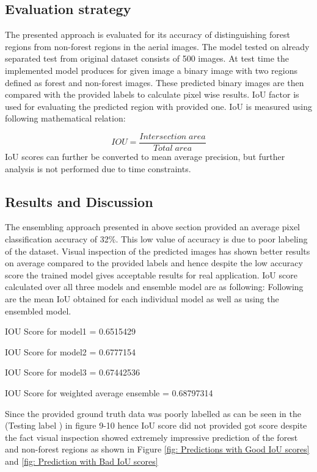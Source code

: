 \documentclass[rnd]{mas_proposal}
\begin{document}
\subsection{Evaluation strategy}



The presented approach is evaluated for its accuracy of distinguishing forest regions from non-forest regions in the aerial images. The model tested on already separated test from original dataset consists of 500 images. At test time the implemented model produces for given image a binary image with two regions defined as forest and non-forest images. These predicted binary images are then compared with the provided labels to calculate pixel wise results. IoU factor is used for evaluating the predicted region with provided one. 
IoU is measured using following mathematical relation:

$$IOU=\frac{Intersection\;area}{Total\;area }$$
IoU scores can further be converted to mean average precision, but further analysis is not performed due to time constraints. 


\subsection{Results and Discussion}

The ensembling approach presented in above section provided an average pixel classification accuracy of 32\%. This low value of accuracy is due to poor 
labeling of the dataset. Visual inspection of the predicted images has shown better results on average compared to the provided labels and hence despite the 
low accuracy score the trained model gives acceptable results for real application. IoU score calculated over all 
three models and ensemble model are as following:
Following are the mean IoU obtained for each individual model as well as using the ensembled model.
\vspace{10px}

IOU Score for model1 =  0.6515429

\vspace{3px}

IOU Score for model2 =  0.6777154

\vspace{3px}
IOU Score for model3 =  0.67442536

\vspace{3px}

IOU Score for weighted average ensemble =  0.68797314 

\vspace{3px}
Since the provided ground truth data was poorly labelled as can be seen in the (Testing label ) in figure 9-10 hence IoU score did not provided got score 
despite the fact visual inspection showed extremely impressive prediction of the forest and non-forest regions as shown in 
Figure \ref{fig: Predictions with Good IoU scores} and \ref{fig: Prediction with Bad IoU scores}
\end{document}

